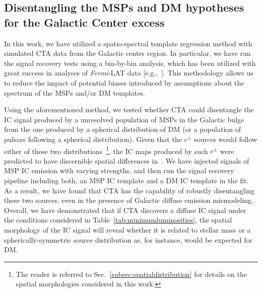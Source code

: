 \documentclass[doublespace,nopageskip]{VTthesis} %
\begin{document}
\subsection{Disentangling the MSPs and DM hypotheses for the Galactic Center excess}
\label{subsec:disentanglingMSPsfromDM}

In this work, we have utilized a spatio-spectral template regression method with simulated CTA data from the Galactic center region. In particular, we have run the signal recovery tests using a bin-by-bin analysis, which has been utilized with great success in analyses of \textit{Fermi}-LAT data [e.g.,~\citep{2015PhRvL.115w1301A,2017ApJ...840...43A}]. This methodology allows us to reduce the impact of potential biases introduced by assumptions about the spectrum of the MSPs and/or DM templates.
 

Using the aforementioned method, we tested whether CTA could disentangle the IC signal produced by a unresolved population of MSPs in the Galactic bulge from the one produced by a spherical distribution of DM (or a population of pulsars following a spherical distribution). Given that the $e^\pm$ sources would follow either of these two distributions~\footnote{The reader is referred to Sec.~\ref{subsec:spatialdistribution} for details on the spatial morphologies considered in this work.}, the IC maps produced by such $e^\pm$ were predicted to have discernible spatial differences in~\cite{2019PhRvD..99l3020S}. We have injected signals of MSP IC emission with varying strengths, and then run the signal recovery pipeline including both, an MSP IC template and a DM IC template in the fit. As a result, we have found that CTA has the capability of robustly disentangling these two sources, even in the presence of Galactic diffuse emission mismodeling. Overall, we have demonstrated that if CTA discovers a diffuse IC signal under the conditions considered in Table~\ref{tab:minimumluminosities}, the spatial morphology of the IC signal will reveal whether it is related to stellar mass or a spherically-symmetric source distribution as, for instance, would be expected for DM.
\end{document}
